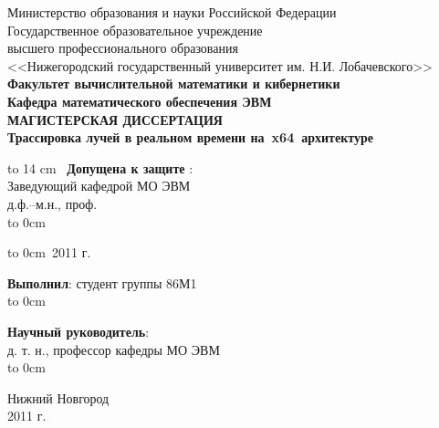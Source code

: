 \documentclass[12pt, a4paper, utf8]{article}
\begin{document}
\begin{titlepage}
\begin{center}
{Министерство образования и науки Российской Федерации\\ 
Государственное образовательное учреждение \\ 
высшего профессионального образования \\ 
<<Нижегородский государственный университет им. Н.И. Лобачевского>>\\

\bf{Факультет вычислительной математики и кибернетики\\
Кафедра математического обеспечения ЭВМ\\
}
\vspace{5em}
МАГИСТЕРСКАЯ ДИССЕРТАЦИЯ\\
}
{\bf \Large	\textsf{ Трассировка лучей в реальном времени на~x64~архитектуре \\ } }
\end{center}
\vspace{3em}
\begin{multicols}{2}
\vbox to 14 cm{\ }
\noindent 
{\bf Допущена к защите} : {\hrulefill}\\
Заведующий кафедрой МО ЭВМ \\
д.ф.--м.н., проф. \\

\vspace*{1em}
{ \noindent
\hspace*{1.5cm}\hbox to 0cm{}\hspace{-1.5cm}{\hrulefill\ \ Стронгин Р. Г. }
}

\vspace*{1em}
{ \noindent
\hbox to 0cm{\raisebox{0.25em}{<<\qquad \qquad \quad >>}}{\hrulefill\ 2011 г. }
}

\noindent
{\bf Выполнил}: студент группы 86М1 \\

\vspace*{0.5em}
{ \noindent
\hspace*{1.5cm}\hbox to 0cm{}\hspace{-1.5cm}{\hrulefill\ \ Морозов А. С. }
}

\vspace{1.5em}
\noindent
{\bf Научный руководитель}: \\
д. т. н., профессор кафедры МО ЭВМ \\

{ \noindent
\hspace*{1.5cm}\hbox to 0cm{}\hspace{-1.5cm}{\hrulefill\ \ Турлапов В. Е. }
}
\end{multicols}
\vfill 
\begin{center} 
{\rm Нижний Новгород \\ 2011 г.} 
\end {center} 
\end{titlepage} 
\end{document}
